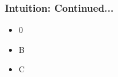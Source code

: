 \documentclass{beamer}
\begin{document}
    \begin{frame}
      \frametitle{Intuition: Continued...}
      \begin{itemize}
            \item 0
            \item<2-> B
            \item<3> C
        \end{itemize}
    \end{frame}
\end{document}
